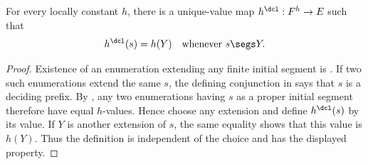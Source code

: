 \begin{lemma}
For every locally constant $h$, there is a unique-value map
$h^{\dcl}:F^h\to E$ such that
\[
h^{\dcl}(s)=h(Y)\quad\text{whenever }s\segs Y.
\]
\end{lemma}
\begin{proof}
Existence of an enumeration extending any finite initial segment is
.  If two such enumerations extend the same $s$, the defining
conjunction in  says that $s$ is a deciding prefix.
By , any two enumerations having $s$ as a proper
initial segment therefore have equal $h$-values.  Hence choose any extension
and define $h^{\dcl}(s)$ by its value.  If $Y$ is another extension of $s$,
the same  equality shows that this value is $h(Y)$.
Thus the definition is independent of the choice and has the displayed
property.
\end{proof}
